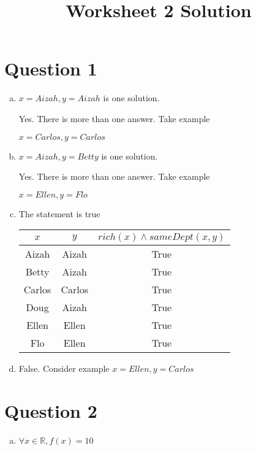 \documentclass[12pt]{article}
\begin{document}
\title{Worksheet 2 Solution}
\maketitle

\section*{Question 1}

\begin{enumerate}[a)]
    \item
        $x = Aizah, y = Aizah$ is one solution.

        \bigskip

        Yes. There is more than one answer. Take example

        $x = Carlos, y = Carlos$

    \bigskip

    \item
        $x = Aizah, y = Betty$ is one solution.

        \bigskip

        Yes. There is more than one answer. Take example

        $x = Ellen, y = Flo$

    \item
        The statement is true

        \begin{tabular}{ c | c | c }
            $x$ & $y$ & $rich(x) \land sameDept(x,y)$ \\
            \hline
            Aizah & Aizah & True \\
            \hline
            Betty & Aizah & True \\
            \hline
            Carlos & Carlos & True \\
            \hline
            Doug & Aizah & True \\
            \hline
            Ellen & Ellen & True \\
            \hline
            Flo & Ellen & True \\
            \hline
        \end{tabular}

    \item
        False. Consider example $x = Ellen, y = Carlos$

\end{enumerate}

\section*{Question 2}

\begin{enumerate}[a)]
    \item
        $\forall x \in \mathbb{R}, f(x) = 10$

\end{enumerate}
\end{document}
